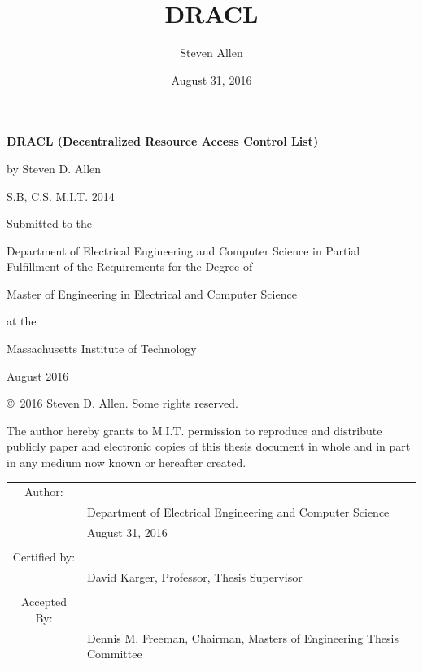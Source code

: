 \documentclass[pdftex,12pt,a4papaer,twoside,notitlepage]{report}
\title{DRACL}
\author{Steven Allen}
\date{August 31, 2016}
\begin{document}

\begin{titlingpage}

  \begin{singlespacing}

    \setlength{\parskip}{1em}
    \begin{center}

      \textbf{DRACL (Decentralized Resource Access Control List)}

      by Steven D. Allen

      S.B, C.S. M.I.T. 2014

      \vspace{2em}

      Submitted to the

      Department of Electrical Engineering and Computer Science in
      Partial Fulfillment of the Requirements for the Degree of

      Master of Engineering in Electrical and Computer Science

      at the

      Massachusetts Institute of Technology

      August 2016

      \copyright~2016 Steven D. Allen. Some rights reserved.

      The author hereby grants to M.I.T. permission to reproduce and distribute
      publicly paper and electronic copies of this thesis document in whole and in
      part in any medium now known or hereafter created.

      \vspace{3em}
      \begin{tabular}{c l}
        Author: & \hrulefill \\
                & {\small Department of Electrical Engineering and Computer Science } \\
                & {\small August 31, 2016 } \\
        \\
        Certified by: & \hrulefill \\
                & {\small David Karger, Professor, Thesis Supervisor } \\
        \\
        Accepted By: & \hrulefill \\
                & {\small Dennis M. Freeman, Chairman, Masters of Engineering Thesis Committee } \\
      \end{tabular}
    \end{center}

  \end{singlespacing}

\end{titlingpage}
\end{document}

